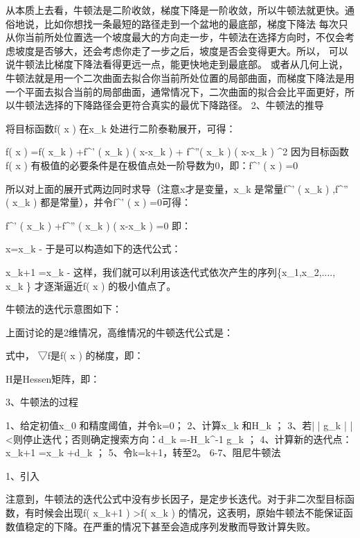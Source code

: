 \documentclass[11pt]{book}
\newcounter{#2}
\newcounter{#2}[#1]
\numberwithin{#2}{#1}
\begin{document}
从本质上去看，牛顿法是二阶收敛，梯度下降是一阶收敛，所以牛顿法就更快。通俗地说，比如你想找一条最短的路径走到一个盆地的最底部，梯度下降法 每次只从你当前所处位置选一个坡度最大的方向走一步，牛顿法在选择方向时，不仅会考虑坡度是否够大，还会考虑你走了一步之后，坡度是否会变得更大。所以， 可以说牛顿法比梯度下降法看得更远一点，能更快地走到最底部。
或者从几何上说，牛顿法就是用一个二次曲面去拟合你当前所处位置的局部曲面，而梯度下降法是用一个平面去拟合当前的局部曲面，通常情况下，二次曲面的拟合会比平面更好，所以牛顿法选择的下降路径会更符合真实的最优下降路径。
2、牛顿法的推导

将目标函数f\left( x \right)  在x_{k} 处进行二阶泰勒展开，可得：

f\left( x \right) =f\left( x_{k}  \right) +f^{'} \left( x_{k}  \right) \left( x-x_{k}  \right) + f^{''}\left( x_{k}  \right)  \left( x-x_{k}  \right) ^{2} 
因为目标函数f\left( x \right) 有极值的必要条件是在极值点处一阶导数为0，即：f^{'} \left( x \right) =0

所以对上面的展开式两边同时求导（注意x才是变量，x_{k} 是常量\Rightarrow f^{'} \left( x_{k}  \right) ,f^{''} \left( x_{k}  \right) 都是常量），并令f^{'} \left( x \right) =0可得：

f^{'} \left( x_{k} \right) +f^{''} \left( x_{k} \right) \left( x-x_{k} \right) =0
即：

x=x_{k} - 
于是可以构造如下的迭代公式：

x_{k+1} =x_{k} - 
这样，我们就可以利用该迭代式依次产生的序列\left\{x_{1},x_{2},....,   x_{k}  \right\} 才逐渐逼近f\left( x \right) 的极小值点了。

牛顿法的迭代示意图如下：


上面讨论的是2维情况，高维情况的牛顿迭代公式是：


式中， ▽f是f\left( x \right) 的梯度，即：

H是Hessen矩阵，即：

3、牛顿法的过程

1、给定初值x_{0} 和精度阈值\varepsilon ，并令k=0；
2、计算x_{k} 和H_{k} ；
3、若\left| \left| g_{k}  \right|  \right| <\varepsilon 则停止迭代；否则确定搜索方向：d_{k} =-H_{k}^{-1} \cdot g_{k} ；
4、计算新的迭代点：x_{k+1} =x_{k} +d_{k} ；
5、令k=k+1，转至2。
6-7、阻尼牛顿法

1、引入

注意到，牛顿法的迭代公式中没有步长因子，是定步长迭代。对于非二次型目标函数，有时候会出现f\left( x_{k+1}  \right) >f\left( x_{k}  \right) 的情况，这表明，原始牛顿法不能保证函数值稳定的下降。在严重的情况下甚至会造成序列发散而导致计算失败。
\end{document}
